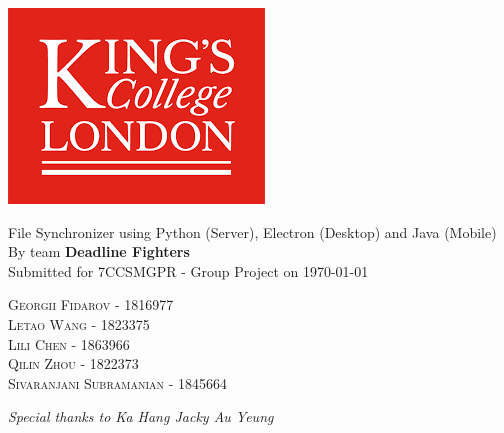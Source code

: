 \begin{titlepage}
\begin{center}
\begin{center}
    \includegraphics[scale=1]{images/Logo.png}
\end{center}
\vspace{50px}
        \Huge{File Synchronizer using Python (Server), Electron (Desktop) and Java (Mobile) }\\
        \vspace{50px}
		\LARGE By team \textbf{Deadline Fighters} \\
    \vspace{20px}
		 \small{Submitted for 7CCSMGPR - Group Project on \today}
\vspace{50px}

		\textsc{\LARGE Georgii Fidarov - 1816977\\
        \LARGE Letao Wang - 1823375\\
        \LARGE Lili Chen - 1863966\\
        \LARGE Qilin Zhou - 1822373\\
        \LARGE Sivaranjani Subramanian - 1845664\\}
\vspace{50px}       

        \emph{Special thanks to Ka Hang Jacky Au Yeung}
\end{center}
\end{titlepage}
